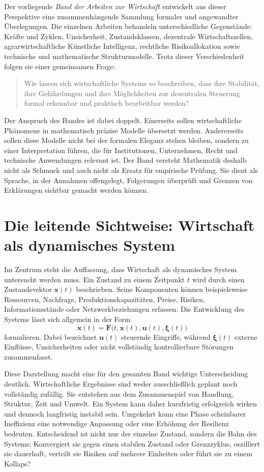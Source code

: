\documentclass[a4paper, 12pt, twoside, openright]{report}
\theoremstyle{definition}
\theoremstyle{definition}
\newcommand{\vx}{\bm{x}}
\newcommand{\vu}{\bm{u}}
\begin{document}
Der vorliegende \emph{Band der Arbeiten zur Wirtschaft} entwickelt aus dieser
Perspektive eine zusammenhängende Sammlung formaler und angewandter Überlegungen.
Die einzelnen Arbeiten behandeln unterschiedliche Gegenstände: Kräfte und Zyklen,
Unsicherheit, Zustandsklassen, dezentrale Wirtschaftszellen, agrarwirtschaftliche
Künstliche Intelligenz, rechtliche Risikoallokation sowie technische und
mathematische Strukturmodelle. Trotz dieser Verschiedenheit folgen sie einer
gemeinsamen Frage:

\begin{quote}
Wie lassen sich wirtschaftliche Systeme so beschreiben, dass ihre Stabilität,
ihre Gefährdungen und ihre Möglichkeiten zur dezentralen Steuerung formal
erkennbar und praktisch bearbeitbar werden?
\end{quote}

Der Anspruch des Bandes ist dabei doppelt. Einerseits sollen wirtschaftliche
Phänomene in mathematisch präzise Modelle übersetzt werden. Andererseits sollen
diese Modelle nicht bei der formalen Eleganz stehen bleiben, sondern zu einer
Interpretation führen, die für Institutionen, Unternehmen, Recht und technische
Anwendungen relevant ist. Der Band versteht Mathematik deshalb nicht als Schmuck
und auch nicht als Ersatz für empirische Prüfung. Sie dient als Sprache, in der
Annahmen offengelegt, Folgerungen überprüft und Grenzen von Erklärungen sichtbar
gemacht werden können.

\section{Die leitende Sichtweise: Wirtschaft als dynamisches System}

Im Zentrum steht die Auffassung, dass Wirtschaft als dynamisches System untersucht
werden muss. Ein Zustand zu einem Zeitpunkt $t$ wird durch einen Zustandsvektor
$\vx(t)$ beschrieben. Seine Komponenten können beispielsweise Ressourcen,
Nachfrage, Produktionskapazitäten, Preise, Risiken, Informationsstände oder
Netzwerkbeziehungen erfassen. Die Entwicklung des Systems lässt sich allgemein in
der Form
\[
  \dot{\vx}(t)=\mathbf{F}\bigl(t,\vx(t),\vu(t),\boldsymbol{\xi}(t)\bigr)
\]
formulieren. Dabei bezeichnet $\vu(t)$ steuernde Eingriffe, während
$\boldsymbol{\xi}(t)$ externe Einflüsse, Unsicherheiten oder nicht vollständig
kontrollierbare Störungen zusammenfasst.

Diese Darstellung macht eine für den gesamten Band wichtige Unterscheidung
deutlich. Wirtschaftliche Ergebnisse sind weder ausschließlich geplant noch
vollständig zufällig. Sie entstehen aus dem Zusammenspiel von Handlung,
Struktur, Zeit und Umwelt. Ein System kann daher kurzfristig erfolgreich wirken
und dennoch langfristig instabil sein. Umgekehrt kann eine Phase scheinbarer
Ineffizienz eine notwendige Anpassung oder eine Erhöhung der Resilienz bedeuten.
Entscheidend ist nicht nur der einzelne Zustand, sondern die Bahn des Systems:
Konvergiert sie gegen einen stabilen Zustand oder Grenzzyklus, oszilliert sie
dauerhaft, verteilt sie Risiken auf mehrere Einheiten oder führt sie zu einem
Kollaps?
\end{document}
